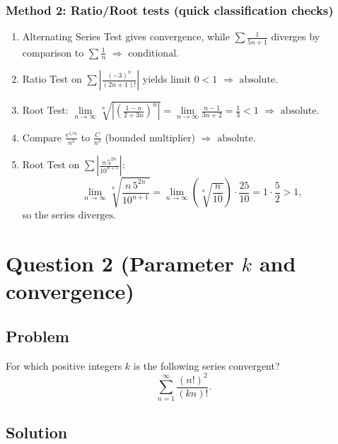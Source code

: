 \documentclass[12pt]{article}
\begin{document}
\subsubsection*{Method 2: Ratio/Root tests (quick classification checks)}
\begin{enumerate}[label=(\alph*)]
\item Alternating Series Test gives convergence, while \(\sum \frac{1}{5n+1}\) diverges by comparison to \(\sum \frac{1}{n}\) \(\Rightarrow\) \(\boxed{\text{conditional}}\).

\item Ratio Test on \(\sum \left|\frac{(-3)^n}{(2n+1)!}\right|\) yields limit \(0<1\) \(\Rightarrow\) \(\boxed{\text{absolute}}\).

\item Root Test: \(\lim\limits_{n\to\infty}\sqrt[n]{\left|\left(\frac{1-n}{2+3n}\right)^{n}\right|}
=\lim\limits_{n\to\infty}\frac{n-1}{3n+2}=\frac{1}{3}<1\) \(\Rightarrow\) \(\boxed{\text{absolute}}\).

\item Compare \(\frac{e^{1/n}}{n^3}\) to \(\frac{C}{n^3}\) (bounded multiplier) \(\Rightarrow\) \(\boxed{\text{absolute}}\).

\item Root Test on \(\sum \left|\frac{n\,5^{2n}}{10^{n+1}}\right|\):
\[
\lim_{n\to\infty}\sqrt[n]{\frac{n\,5^{2n}}{10^{n+1}}}
=\lim_{n\to\infty}\left(\sqrt[n]{\frac{n}{10}}\right)\cdot \frac{25}{10}
=1\cdot \frac{5}{2}>1,
\]
so the series \(\boxed{\text{diverges}}\).
\end{enumerate}



\newpage
\section*{Question 2 (Parameter \(k\) and convergence)}
\subsection*{Problem}
For which positive integers \(k\) is the following series convergent?
\[
\sum_{n=1}^{\infty} \frac{(n!)^2}{(kn)!}.
\]
\noindent

\bigskip
\subsection*{Solution}
\end{document}
